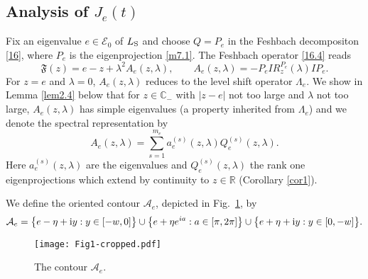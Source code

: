 \documentclass[letterpaper,onecolumn,11pt,accepted=2021-12-09]{quantumarticle}
\numberwithin{equation}{section}
\newcommand{\aes}{a_e^{(s)}}
\newcommand{\Qes}{Q_e^{(s)}}
\newcommand{\s}{{\rm S}}
\renewcommand{\i}{{\rm i}}
\begin{document}
\subsection{Analysis of $J_e(t)$}
\label{sect4.1}

Fix an eigenvalue $e\in{\mathcal E}_0$ of $L_\s$ and choose $Q=P_e$ in the Feshbach decompositon \eqref{16}, where $P_e$ is the eigenprojection  \eqref{m7.1}. The Feshbach operator \eqref{16.4} reads
\begin{equation}
{\mathfrak F}(z) = e-z +\lambda^2 A_e(z,\lambda), \qquad A_e(z,\lambda)=  - P_e I  R_z^{P_e}(\lambda) IP_e.
\label{23.1}
\end{equation}
For $z=e$ and $\lambda=0$, $A_e(z,\lambda)$ reduces to the level shift operator $\Lambda_e$. We show in Lemma \ref{lem2.4} below that for $z\in{\mathbb C}_-$ with $|z-e|$ not too large and $\lambda$ not too large, $A_e(z,\lambda)$ has simple eigenvalues (a property inherited from $\Lambda_e$) and we denote the spectral representation by 
\begin{equation}
	A_e(z,\lambda)  = \sum_{s=1}^{m_e} \aes(z,\lambda) \Qes(z,\lambda).
	\label{89.1}
\end{equation}
Here $a_e^{(s)}(z,\lambda)$ are the eigenvalues and $Q_e^{(s)}(z,\lambda)$ the rank one eigenprojections which extend by continuity to $z\in{\mathbb R}$ (Corollary \ref{cor1}).






We define the oriented contour ${\mathcal A}_e$, depicted in  Fig.~\ref{Fig3}, by
 \begin{equation}
 	\label{40-1}
 	{\mathcal A}_e = \big\{e-\eta+\i y : y\in[-w,0]\big\} \cup \big\{e+ \eta e^{ia} : a\in[\pi,2\pi]\big\} \cup \big\{e+ \eta+\i y : y\in[0,-w]\big\}.
 \end{equation} 



\begin{figure}[t]
	\centering
 	\texttt{[image: Fig1-cropped.pdf]}
	\caption{The contour ${\mathcal A}_e$.}
	\label{Fig3}
\end{figure}
\end{document}
